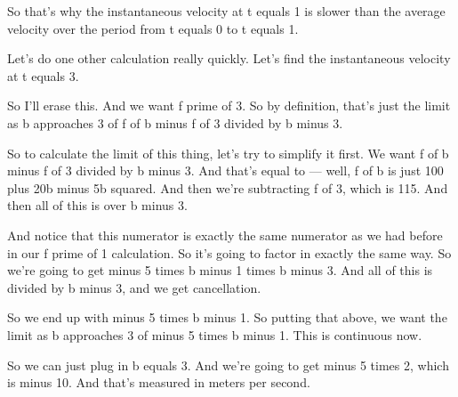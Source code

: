 \documentclass[pdftex, brazil, 12pt, twoside]{article}
\begin{document}
So that's why the instantaneous velocity at t
equals 1 is slower than the average velocity
over the period from t equals 0 to t equals 1.

Let's do one other calculation really quickly.
Let's find the instantaneous velocity at t equals 3.

So I'll erase this.
And we want f prime of 3.
So by definition, that's just the limit
as b approaches 3 of f of b minus f of 3
divided by b minus 3.

So to calculate the limit of this thing,
let's try to simplify it first.
We want f of b minus f of 3 divided by b minus 3.
And that's equal to --- well, f of b is just 100
plus 20b minus 5b squared.
And then we're subtracting f of 3, which is 115.
And then all of this is over b minus 3.

And notice that this numerator is exactly the same numerator
as we had before in our f prime of 1 calculation.
So it's going to factor in exactly the same way.
So we're going to get minus 5 times b minus 1 times b
minus 3.
And all of this is divided by b minus 3,
and we get cancellation.

So we end up with minus 5 times b minus 1.
So putting that above, we want the limit
as b approaches 3 of minus 5 times b minus 1.
This is continuous now.

So we can just plug in b equals 3.
And we're going to get minus 5 times 2, which is minus 10.
And that's measured in meters per second.

\begin{figure}[H]
  \begin{center}
    \label{fig:derivative-at-point-3}
  \end{center}
\end{figure}
\end{document}
